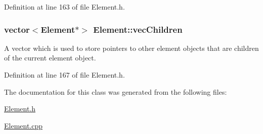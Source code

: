 Definition at line 163 of file Element.\+h.

\hypertarget{class_element_aaa1b0172c42894dfa91643fdf2c4babe}{
\subsubsection[{vec\+Children}]{\setlength{\rightskip}{0pt plus 5cm}vector$<${\bf Element}$\ast$$>$ Element\+::vec\+Children}}\label{class_element_aaa1b0172c42894dfa91643fdf2c4babe}
A vector which is used to store pointers to other element objects that are children of the current element object. 

Definition at line 167 of file Element.\+h.



The documentation for this class was generated from the following files\+:\begin{DoxyCompactItemize}
\item 
\hyperlink{_element_8h}{Element.\+h}\item 
\hyperlink{_element_8cpp}{Element.\+cpp}\end{DoxyCompactItemize}
